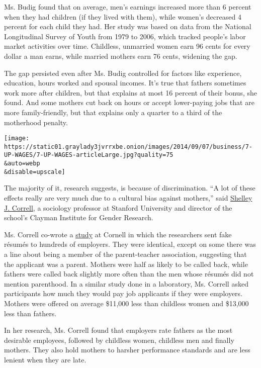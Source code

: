 Ms. Budig found that on average, men's earnings increased more than 6
percent when they had children (if they lived with them), while women's
decreased 4 percent for each child they had. Her study was based on data
from the National Longitudinal Survey of Youth from 1979 to 2006, which
tracked people's labor market activities over time. Childless, unmarried
women earn 96 cents for every dollar a man earns, while married mothers
earn 76 cents, widening the gap.

The gap persisted even after Ms. Budig controlled for factors like
experience, education, hours worked and spousal incomes. It's true that
fathers sometimes work more after children, but that explains at most 16
percent of their bonus, she found. And some mothers cut back on hours or
accept lower-paying jobs that are more family-friendly, but that
explains only a quarter to a third of the motherhood penalty.

\texttt{[image: https://static01.graylady3jvrrxbe.onion/images/2014/09/07/business/7-UP-WAGES/7-UP-WAGES-articleLarge.jpg?quality=75\\\&auto=webp\\\&disable=upscale]}

The majority of it, research suggests, is because of discrimination. ``A
lot of these effects really are very much due to a cultural bias against
mothers,'' said
\href{https://sociology.stanford.edu/people/shelley-correll}{Shelley J.
Correll}, a sociology professor at Stanford University and director of
the school's Clayman Institute for Gender Research.

Ms. Correll co-wrote a
\href{http://gender.stanford.edu/sites/default/files/motherhoodpenalty.pdf}{study}
at Cornell in which the researchers sent fake résumés to hundreds of
employers. They were identical, except on some there was a line about
being a member of the parent-teacher association, suggesting that the
applicant was a parent. Mothers were half as likely to be called back,
while fathers were called back slightly more often than the men whose
résumés did not mention parenthood. In a similar study done in a
laboratory, Ms. Correll asked participants how much they would pay job
applicants if they were employers. Mothers were offered on average
\$11,000 less than childless women and \$13,000 less than fathers.

In her research, Ms. Correll found that employers rate fathers as the
most desirable employees, followed by childless women, childless men and
finally mothers. They also hold mothers to harsher performance standards
and are less lenient when they are late.

